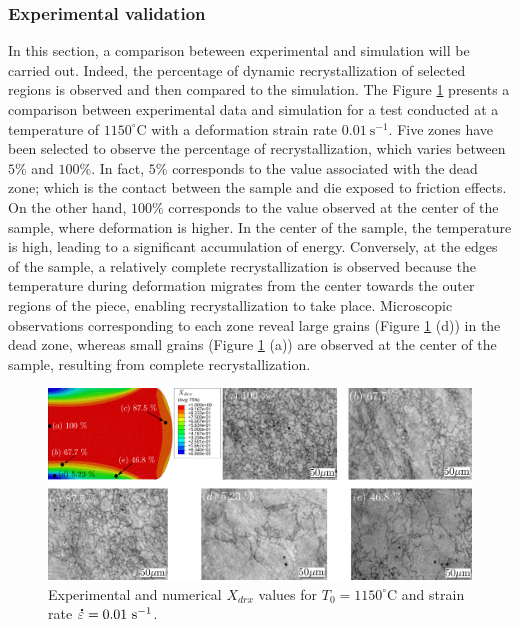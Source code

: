 \documentclass[metals,article,submit,pdftex,moreauthors]{Definitions/mdpi}
\DeclareRobustCommand{\mdot}[1]{\accentset{\mbox{\bfseries .}}{#1}}
\begin{document}
\subsubsection{Experimental validation \label{subsec:ExpValid}}
In this section, a comparison beteween experimental and simulation will be carried out.
Indeed, the percentage of dynamic recrystallization of selected regions is observed and then compared to the simulation. The Figure \ref{fig:expNumDRX} presents a comparison between experimental data and simulation for a test conducted at a temperature of $1150^\circ$C with a deformation strain rate $0.01~\text{s}^{-1}$. Five zones have been selected to observe the percentage of recrystallization, which varies between $5\%$ and $100\%$. In fact, $5\%$ corresponds to the value associated with the dead zone; which is the contact between the sample and die exposed to friction effects. On the other hand, $100\%$ corresponds to the value observed at the center of the sample, where deformation is higher. In the center of the sample, the temperature is high, leading to a significant accumulation of energy. Conversely, at the edges of the sample, a relatively complete recrystallization is observed because the temperature during deformation migrates from the center towards the outer regions of the piece, enabling recrystallization to take place. Microscopic observations corresponding to each zone reveal large grains (Figure \ref{fig:expNumDRX} (d)) in the dead zone, whereas small grains (Figure \ref{fig:expNumDRX} (a)) are observed at the center of the sample, resulting from complete recrystallization.
\begin{figure}[H]
\includegraphics[width=0.98\columnwidth]{Figures/expNumDRX}
\caption{Experimental and numerical $X_{drx}$ values for $T_0=1150^\circ$C and strain rate $\mdot{\varepsilon}=0.01~\text{s}^{-1}$.}
\label{fig:expNumDRX}
\end{figure}
\end{document}
